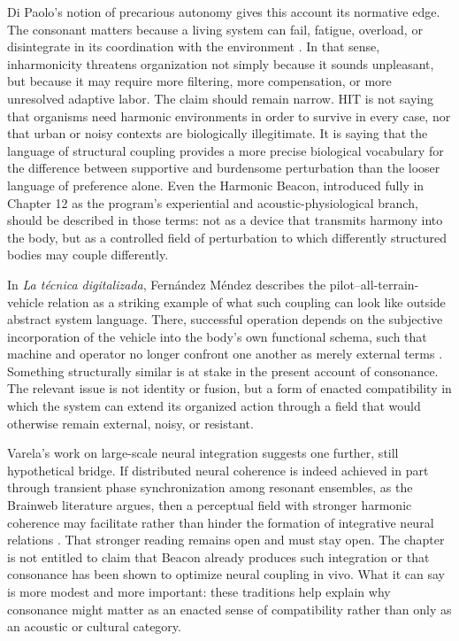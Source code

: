 Di Paolo's notion of precarious autonomy gives this account its normative edge. The consonant matters because a living system can fail, fatigue, overload, or disintegrate in its coordination with the environment \parencite{dipaolo_2005}. In that sense, inharmonicity threatens organization not simply because it sounds unpleasant, but because it may require more filtering, more compensation, or more unresolved adaptive labor. The claim should remain narrow. HIT is not saying that organisms need harmonic environments in order to survive in every case, nor that urban or noisy contexts are biologically illegitimate. It is saying that the language of structural coupling provides a more precise biological vocabulary for the difference between supportive and burdensome perturbation than the looser language of preference alone. Even the Harmonic Beacon, introduced fully in Chapter 12 as the program's experiential and acoustic-physiological branch, should be described in those terms: not as a device that transmits harmony into the body, but as a controlled field of perturbation to which differently structured bodies may couple differently.

In \emph{La t\'ecnica digitalizada}, Fern\'andez M\'endez describes the pilot--all-terrain-vehicle relation as a striking example of what such coupling can look like outside abstract system language. There, successful operation depends on the subjective incorporation of the vehicle into the body's own functional schema, such that machine and operator no longer confront one another as merely external terms \parencite{fernandez_2021b}. Something structurally similar is at stake in the present account of consonance. The relevant issue is not identity or fusion, but a form of enacted compatibility in which the system can extend its organized action through a field that would otherwise remain external, noisy, or resistant.

Varela's work on large-scale neural integration suggests one further, still hypothetical bridge. If distributed neural coherence is indeed achieved in part through transient phase synchronization among resonant ensembles, as the Brainweb literature argues, then a perceptual field with stronger harmonic coherence may facilitate rather than hinder the formation of integrative neural relations \parencite{varela_2001_brainweb, rodriguez_1999}. That stronger reading remains open and must stay open. The chapter is not entitled to claim that Beacon already produces such integration or that consonance has been shown to optimize neural coupling in vivo. What it can say is more modest and more important: these traditions help explain why consonance might matter as an enacted sense of compatibility rather than only as an acoustic or cultural category.

